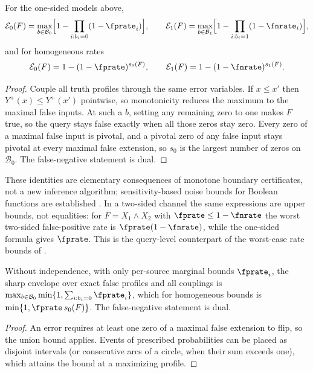 \begin{theorem}
\label{thm:query-contract}
For the one-sided models above,
\[
  \mathcal{E}_0(F) = \max_{b \in \mathcal{B}_0}
    \Bigl[1 - \prod_{i : b_i = 0} (1 - \fprate_i)\Bigr],
  \qquad
  \mathcal{E}_1(F) = \max_{b \in \mathcal{B}_1}
    \Bigl[1 - \prod_{i : b_i = 1} (1 - \fnrate_i)\Bigr],
\]
and for homogeneous rates
\[
  \mathcal{E}_0(F) = 1 - (1 - \fprate)^{s_0(F)},
  \qquad
  \mathcal{E}_1(F) = 1 - (1 - \fnrate)^{s_1(F)}.
\]
\end{theorem}

\begin{proof}
Couple all truth profiles through the same error variables. If $x \le x'$ then
$Y^{+}(x) \le Y^{+}(x')$ pointwise, so monotonicity reduces the maximum to the
maximal false inputs. At such a $b$, setting any remaining zero to one makes $F$
true, so the query stays false exactly when all those zeros stay zero. Every zero of
a maximal false input is pivotal, and a pivotal zero of any false input stays
pivotal at every maximal false extension, so $s_0$ is the largest number of zeros
on $\mathcal{B}_0$. The false-negative statement is dual.
\end{proof}

These identities are elementary consequences of monotone boundary certificates,
not a new inference algorithm; sensitivity-based noise bounds for Boolean
functions are established \parencite{gopalan-et-al-2016}. In a two-sided channel
the same expressions are upper bounds, not equalities: for $F = X_1 \land X_2$
with $\fprate \le 1 - \fnrate$ the worst two-sided false-positive rate is
$\fprate(1 - \fnrate)$, while the one-sided formula gives $\fprate$. This is the
query-level counterpart of the worst-case rate bounds of
.

\begin{theorem}
\label{thm:query-contract-dependent}
Without independence, with only per-source marginal bounds $\fprate_i$, the sharp
envelope over exact false profiles and all couplings is $\max_{b \in
\mathcal{B}_0} \min\{1, \sum_{i : b_i = 0} \fprate_i\}$, which for homogeneous
bounds is $\min\{1, \fprate\, s_0(F)\}$. The false-negative statement is dual.
\end{theorem}

\begin{proof}
An error requires at least one zero of a maximal false extension to flip, so the
union bound applies. Events of prescribed probabilities can be placed as disjoint
intervals (or consecutive arcs of a circle, when their sum exceeds one), which
attains the bound at a maximizing profile.
\end{proof}


